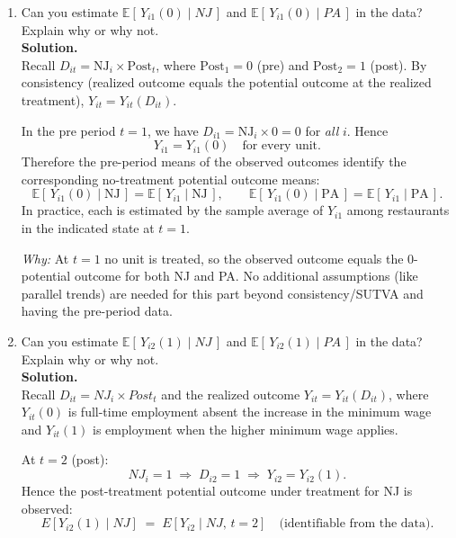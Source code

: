 \documentclass[12pt]{article}
\begin{document}
\begin{enumerate}[label=\textbf{(\alph*)}, leftmargin=1.5em]
  \item Can you estimate $\mathbb{E}[\,Y_{i1}(0)\mid NJ\,]$ and $\mathbb{E}[\,Y_{i1}(0)\mid PA\,]$ in the data? Explain why or why not.\\[0.5em]
  
  \textbf{Solution.} \\
  Recall $D_{it} = \text{NJ}_i \times \text{Post}_t$, where $\text{Post}_1=0$ (pre) and $\text{Post}_2=1$ (post). 
  By consistency (realized outcome equals the potential outcome at the realized treatment), $Y_{it}=Y_{it}(D_{it})$.

  In the pre period $t=1$, we have $D_{i1}=\text{NJ}_i \times 0 = 0$ for \emph{all} $i$. Hence
  \[
  Y_{i1}=Y_{i1}(0)\quad\text{for every unit.}
  \]
  Therefore the pre-period means of the observed outcomes identify the corresponding no-treatment potential outcome means:
  \[
  \mathbb{E}\!\left[\,Y_{i1}(0)\mid \text{NJ}\,\right] 
  = \mathbb{E}\!\left[\,Y_{i1}\mid \text{NJ}\,\right],
  \qquad
  \mathbb{E}\!\left[\,Y_{i1}(0)\mid \text{PA}\,\right] 
  = \mathbb{E}\!\left[\,Y_{i1}\mid \text{PA}\,\right].
  \]
  In practice, each is estimated by the sample average of $Y_{i1}$ among restaurants in the indicated state at $t=1$.

  \emph{Why:} At $t=1$ no unit is treated, so the observed outcome equals the $0$-potential outcome for both NJ and PA. No additional assumptions (like parallel trends) are needed for this part beyond consistency/SUTVA and having the pre-period data.

  \item Can you estimate $\mathbb{E}[\,Y_{i2}(1)\mid NJ\,]$ and $\mathbb{E}[\,Y_{i2}(1)\mid PA\,]$ in the data? Explain why or why not.\\[0.5em]
  
  \textbf{Solution.} \\

  Recall $D_{it} = NJ_i \times Post_t$ and the realized outcome $Y_{it} = Y_{it}(D_{it})$,
  where $Y_{it}(0)$ is full-time employment absent the increase in the minimum wage and
  $Y_{it}(1)$ is employment when the higher minimum wage applies.

  At $t=2$ (post):
  \[
  NJ_i=1 \;\Rightarrow\; D_{i2}=1 \;\Rightarrow\; Y_{i2}=Y_{i2}(1).
  \]
  Hence the post-treatment potential outcome under treatment for NJ is observed:
  \[
  E\!\left[Y_{i2}(1)\mid NJ\right] \;=\; E\!\left[Y_{i2}\mid NJ,\, t=2\right] \quad \text{(identifiable from the data).}
  \]


\end{enumerate}
\end{document}
